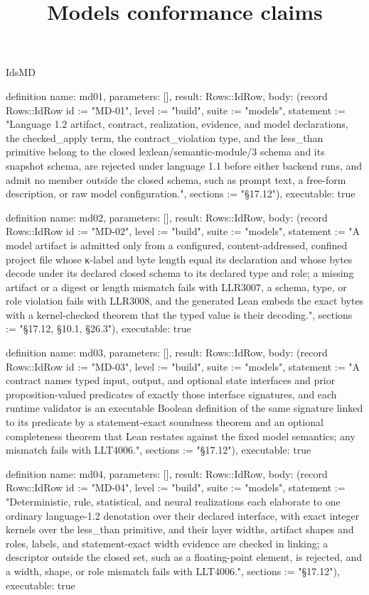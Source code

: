 \begin{lexlean}{IdsMD}
\title{Models conformance claims}
\begin{semanticmodule}
definition{
  name: md01,
  parameters: [],
  result: Rows::IdRow,
  body: (record Rows::IdRow {id := "MD-01", level := "build", suite := "models", statement := "Language 1.2 artifact, contract, realization, evidence, and model declarations, the checked_apply term, the contract_violation type, and the less_than primitive belong to the closed lexlean/semantic-module/3 schema and its snapshot schema, are rejected under language 1.1 before either backend runs, and admit no member outside the closed schema, such as prompt text, a free-form description, or raw model configuration.", sections := "§17.12"}),
  executable: true
}

definition{
  name: md02,
  parameters: [],
  result: Rows::IdRow,
  body: (record Rows::IdRow {id := "MD-02", level := "build", suite := "models", statement := "A model artifact is admitted only from a configured, content-addressed, confined project file whose κ-label and byte length equal its declaration and whose bytes decode under its declared closed schema to its declared type and role; a missing artifact or a digest or length mismatch fails with LLR3007, a schema, type, or role violation fails with LLR3008, and the generated Lean embeds the exact bytes with a kernel-checked theorem that the typed value is their decoding.", sections := "§17.12, §10.1, §26.3"}),
  executable: true
}

definition{
  name: md03,
  parameters: [],
  result: Rows::IdRow,
  body: (record Rows::IdRow {id := "MD-03", level := "build", suite := "models", statement := "A contract names typed input, output, and optional state interfaces and prior proposition-valued predicates of exactly those interface signatures, and each runtime validator is an executable Boolean definition of the same signature linked to its predicate by a statement-exact soundness theorem and an optional completeness theorem that Lean restates against the fixed model semantics; any mismatch fails with LLT4006.", sections := "§17.12"}),
  executable: true
}

definition{
  name: md04,
  parameters: [],
  result: Rows::IdRow,
  body: (record Rows::IdRow {id := "MD-04", level := "build", suite := "models", statement := "Deterministic, rule, statistical, and neural realizations each elaborate to one ordinary language-1.2 denotation over their declared interface, with exact integer kernels over the less_than primitive, and their layer widths, artifact shapes and roles, labels, and statement-exact width evidence are checked in linking; a descriptor outside the closed set, such as a floating-point element, is rejected, and a width, shape, or role mismatch fails with LLT4006.", sections := "§17.12"}),
  executable: true
}


\end{semanticmodule}
\end{lexlean}
